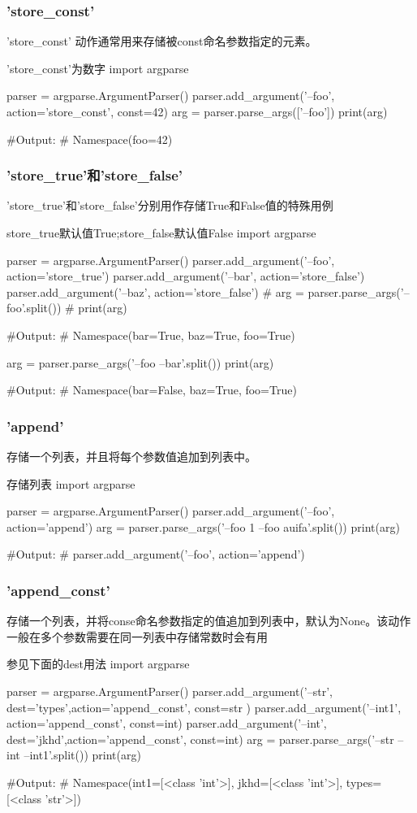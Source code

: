 \documentclass[11pt]{article}
\begin{document}
\subsubsection{'store\_const'}
 	'store\_const' 动作通常用来存储被const命名参数指定的元素。
 	\begin{Python}{'store\_const'为数字}
import argparse

parser = argparse.ArgumentParser()
parser.add_argument('--foo', action='store_const', const=42)
arg = parser.parse_args(['--foo'])
print(arg)

#Output:
#		Namespace(foo=42)
 	\end{Python}
\subsubsection{'store\_true'和'store\_false'}
'store\_true'和'store\_false'分别用作存储True和False值的特殊用例
\begin{Python}{store\_true默认值True;store\_false默认值False}
import argparse

parser = argparse.ArgumentParser()
parser.add_argument('--foo', action='store_true')
parser.add_argument('--bar', action='store_false')
parser.add_argument('--baz', action='store_false')
# arg = parser.parse_args('--foo'.split())
# print(arg)

#Output:
#       Namespace(bar=True, baz=True, foo=True)

arg = parser.parse_args('--foo --bar'.split())
print(arg)

#Output:
#       Namespace(bar=False, baz=True, foo=True)
\end{Python}
\subsubsection{'append'}
存储一个列表，并且将每个参数值追加到列表中。
\begin{Python}{存储列表}
import argparse

parser = argparse.ArgumentParser()
parser.add_argument('--foo', action='append')
arg = parser.parse_args('--foo 1 --foo auifa'.split())
print(arg)

#Output:
#       parser.add_argument('--foo', action='append')	
\end{Python}
\subsubsection{'append\_const'}
存储一个列表，并将conse命名参数指定的值追加到列表中，默认为None。该动作一般在多个参数需要在同一列表中存储常数时会有用
\begin{Python}{参见下面的dest用法}
import argparse

parser = argparse.ArgumentParser()
parser.add_argument('--str', dest='types',action='append_const', const=str )
parser.add_argument('--int1', action='append_const', const=int)
parser.add_argument('--int', dest='jkhd',action='append_const', const=int)
arg = parser.parse_args('--str --int --int1'.split())
print(arg)

#Output:
#       Namespace(int1=[<class 'int'>], jkhd=[<class 'int'>], types=[<class 'str'>])
\end{Python}
\end{document}
